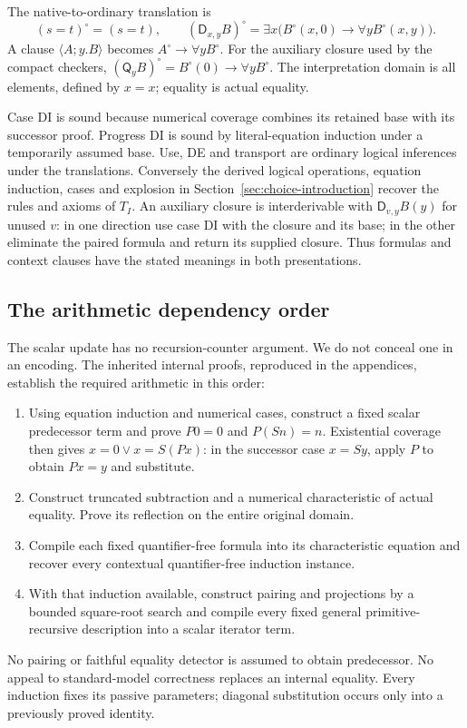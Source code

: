 \documentclass[11pt,letterpaper]{article}
\theoremstyle{definition}\newtheorem{definition}[theorem]{Definition}
\theoremstyle{remark}\newtheorem{remark}[theorem]{Remark}
\begin{document}
The native-to-ordinary translation is
\[
(s=t)^\circ=(s=t),\qquad
(\mathsf D_{x,y}B)^\circ=
\exists x\bigl(B^\circ(x,0)\to\forall y B^\circ(x,y)\bigr).
\]
A clause $\langle A;y.B\rangle$ becomes $A^\circ\to\forall yB^\circ$.
For the auxiliary closure used by the compact checkers,
$(\mathsf Q_yB)^\circ=B^\circ(0)\to\forall yB^\circ$.
The interpretation domain is all elements, defined by $x=x$;
equality is actual equality.

Case DI is sound because numerical coverage combines its retained base
with its successor proof. Progress DI is sound by literal-equation
induction under a temporarily assumed base. Use, DE and transport are
ordinary logical inferences under the translations. Conversely the
derived logical operations, equation induction, cases and explosion in
Section~\ref{sec:choice-introduction} recover the rules and axioms of
$T_I$. An auxiliary closure is interderivable with
$\mathsf D_{v,y}B(y)$ for unused $v$: in one direction use case DI with
the closure and its base; in the other eliminate the paired formula
and return its supplied closure. Thus formulas and context clauses have
the stated meanings in both presentations.

\subsection{The arithmetic dependency order}

The scalar update has no recursion-counter argument. We do not conceal
one in an encoding. The inherited internal proofs, reproduced in the
appendices, establish the required arithmetic in this order:
\begin{enumerate}
\item Using equation induction and numerical cases, construct a fixed
scalar predecessor term and prove $P0=0$ and $P(Sn)=n$.
Existential coverage then gives $x=0\vee x=S(Px)$: in the successor
case $x=Sy$, apply $P$ to obtain $Px=y$ and substitute.
\item Construct truncated subtraction and a numerical characteristic
of actual equality. Prove its reflection on the entire original domain.
\item Compile each fixed quantifier-free formula into its characteristic
equation and recover every contextual quantifier-free induction instance.
\item With that induction available, construct pairing and projections
by a bounded square-root search and compile every fixed general
primitive-recursive description into a scalar iterator term.
\end{enumerate}
No pairing or faithful equality detector is assumed to obtain
predecessor. No appeal to standard-model correctness replaces an
internal equality. Every induction fixes its passive parameters;
diagonal substitution occurs only into a previously proved identity.
\end{document}

